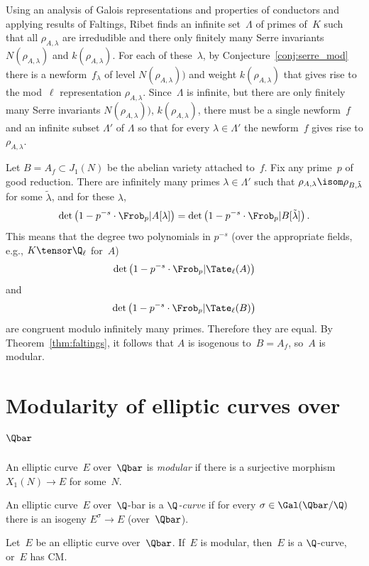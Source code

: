 \documentclass{report}
\begin{document}
Using an analysis of Galois representations and properties of
conductors and applying results of Faltings, Ribet finds an infinite
set~$\Lambda$ of primes of~$K$ such that all $\rho_{A,\lambda}$ are
irredudible and there only finitely many Serre invariants
$N(\rho_{A,\lambda})$ and $k(\rho_{A,\lambda})$.  For each of
these~$\lambda$, by Conjecture~\ref{conj:serre_mod} there is a
newform~$f_{\lambda}$ of level $N(\rho_{A,\lambda}))$ and weight
$k(\rho_{A,\lambda})$ that gives rise to the mod~$\ell$ representation
$\rho_{A,\lambda}$.  Since~$\Lambda$ is infinite, but there are only
finitely many Serre invariants $N(\rho_{A,\lambda}))$,
$k(\rho_{A,\lambda})$, there must be a single newform~$f$ and an
infinite subset $\Lambda'$ of $\Lambda$ so that for every
$\lambda\in\Lambda'$ the newform~$f$ gives rise to $\rho_{A,\lambda}$.

Let $B=A_f\subset J_1(N)$ be the abelian variety attached to~$f$.
Fix any prime~$p$ of good reduction.
There are infinitely many primes $\lambda\in\Lambda'$ such
that $\rho_{A,\lambda}\isom \rho_{B,\tilde{\lambda}}$ for
some $\tilde{\lambda}$, and for these $\lambda$,
$$
  \det\left(1-p^{-s}\cdot \Frob_p|A[\lambda]\right)
   =
  \det\left(1-p^{-s}\cdot \Frob_p|B[\tilde{\lambda}]\right).
  $$
  This means that the degree two polynomials in $p^{-s}$ (over the
  appropriate fields, e.g., $K\tensor\Q_{\ell}$ for~$A$)
$$\det\left(1-p^{-s}\cdot \Frob_p|\Tate_{\ell}(A)\right)$$
and
$$\det\left(1-p^{-s}\cdot \Frob_p|\Tate_{\ell}(B)\right)$$
are congruent modulo infinitely many primes.  Therefore
they are equal. By Theorem~\ref{thm:faltings}, it follows
that $A$ is isogenous to~$B=A_f$, so~$A$ is modular.


\section{Modularity of elliptic curves over $\Qbar$}
\begin{definition}
  An elliptic curve~$E$ over~$\Qbar$ is {\em modular} if there is a
  surjective morphism $X_1(N)\to{}E$ for some~$N$.
\end{definition}

\begin{definition}[$\Q$-curve]
  An elliptic curve~$E$ over~$\Q$-bar is a {\em $\Q$-curve} if for
  every $\sigma\in\Gal(\Qbar/\Q)$ there is an isogeny $E^\sigma \to E$
  (over~$\Qbar$).
\end{definition}

\begin{theorem}[Ribet]
  Let~$E$ be an elliptic curve over~$\Qbar$.  If~$E$ is modular,
  then~$E$ is a $\Q$-curve, or~$E$ has CM.
\end{theorem}
\end{document}
